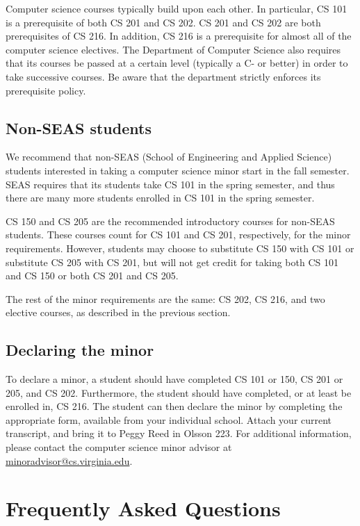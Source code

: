 \documentclass[12pt,twoside]{article}
\begin{document}
Computer science courses typically build upon each other. In
particular, CS 101 is a prerequisite of both CS 201 and CS 202.  CS
201 and CS 202 are both prerequisites of CS 216. In addition, CS 216
is a prerequisite for almost all of the computer science electives.
The Department of Computer Science also requires that its courses be
passed at a certain level (typically a C- or better) in order to take
successive courses. Be aware that the department strictly enforces its
prerequisite policy.

\subsection{Non-SEAS students}

We recommend that non-SEAS (School of Engineering and Applied Science)
students interested in taking a computer science minor start in the
fall semester. SEAS requires that its students take CS 101 in the
spring semester, and thus there are many more students enrolled in CS
101 in the spring semester.

CS 150 and CS 205 are the recommended introductory courses for
non-SEAS students. These courses count for CS 101 and CS 201,
respectively, for the minor requirements.  However, students may
choose to substitute CS 150 with CS 101 or substitute CS 205 with CS
201, but will not get credit for taking both CS 101 and CS 150 or both
CS 201 and CS 205.

The rest of the minor requirements are the same: CS 202, CS 216, and
two elective courses, as described in the previous section.

\subsection{Declaring the minor}

To declare a minor, a student should have completed CS 101 or 150, CS
201 or 205, and CS 202.  Furthermore, the student should have
completed, or at least be enrolled in, CS 216.  The student can then
declare the minor by completing the appropriate form, available from
your individual school.  Attach your current transcript, and bring it
to Peggy Reed in Olsson 223.  For additional information, please
contact the computer science minor advisor at
\url{minoradvisor@cs.virginia.edu}.



\section{Frequently Asked Questions}
\end{document}

